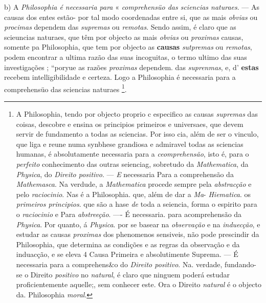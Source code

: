 b) A \emph{Philosophia é necessaria para} « \emph{comprehensüo das sciencias naturaes}. --- As causas dos entes estão- por tal modo coordenadas entre si, que as mais \emph{obvias} ou \emph{procimas} dependem das \emph{supremas} ou \emph{remotas}. Sendo assim, é claro que as scieuncias naturaes, que têm por objecto as mais \emph{obvias} ou \emph{proximas} causas, somente pa Philosophia, que tem por objecto as \textbf{causas} \emph{sutpremas} ou \emph{remotas}, podem encontrar a ultima razão das suas incoguitas, o termo ultimo das suas investigações ; “poryue as razões \emph{proximas} dependem. das \emph{suprenmas}, e, d' \textbf{estas} recebem intelligibilidade e certeza. Logo a Philosophia é necessaria para a comprehensüo das sciencias naturaes \footnote{A Philosophia, tendo por objecto proprio c especifico as causas \emph{supremas} das coisas, descobre e ensina os principios primeiros e universaes, que devem servir de fundamento a todas as sciencias. Por isso cia, além de ser o vinculo, que liga e reune numa synbhese grandiosa e admiravel todas as sciencias humanas, é absolutamente necessaria para a \emph{ceomprehensão}, isto é, para o \emph{perfeito} conhecimento das outras seienciag, sobretudo da \emph{Mathematica}, da \emph{Physica}, do \emph{Direito positivo}. --- \emph{E} necessaria Para a comprehensão da \emph{Mathemasca}. Na verdude, a \emph{Mathematica} procede sempre pela \emph{abstracção} e pelo \emph{raciocinio}. Nas é a Philosophia. que, além de dar a \emph{Ma}- \emph{Hiematica}. os \emph{primeiros principios}. que são a hase \emph{de} toda a seiencia, forma o espirito para o \emph{raciocinio} e Para \emph{abstreeção}. ---- É necessaria. para acomprehensão da \emph{Physica}. Por quanto, á \emph{Physica}. por se basear na \emph{observação} e na \emph{induecção}, e estudar as causas \emph{proximas} dos phenomenos sensiveis, não pode prescindir da Philosophia, que determina as condições e as regras da observação e da induacção, e se eleva 4 Causa Primeira e absolutimente Suprema. --- É necessaria para a comprehens\&o do \emph{Direito positivo}. Na. verdade, fundando-se o Direito \emph{positivo} no \emph{natural}, é claro que ninguem poderá estudar proficientemente aquelle;, sem conhecer este. Ora o Direito \emph{natural} é o objecto da. Philosophia \emph{moral}.}.


 

